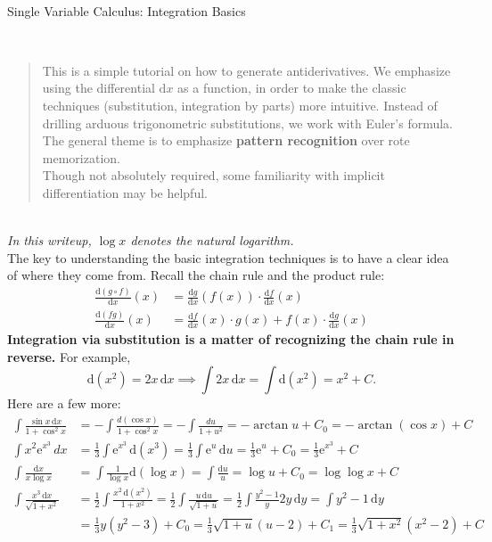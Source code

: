 \documentclass[12pt]{memoir}
\def\br{~\\[1em]}
\def\dd{\mathrm d}
\def\ee{\mathrm e}
\begin{document}
~\\[0em]
\begin{center}
\Large Single Variable Calculus: Integration Basics 
\end{center}
~\\[-2em]
\begin{abstract}
This is a simple tutorial on how to generate antiderivatives.
We emphasize using the differential $\dd x$ as a function,
in order to make the classic techniques (substitution,
integration by parts) more intuitive. Instead of drilling
arduous trigonometric substitutions, we work with Euler's formula.
The general theme is to emphasize \textbf{pattern recognition}
over rote memorization.
\br
Though not absolutely required,
some familiarity with implicit differentiation may be helpful.
\end{abstract}
~\\[0em]
\textit{In this writeup, $\log x$ denotes the natural logarithm.}
\br
The key to understanding the basic integration techniques is to
have a clear idea of where they come from. Recall the chain rule
and the product rule:
\begin{align*}
\frac{\dd(g\circ f)}{\dd x}(x)
&= \frac{\dd g}{\dd x}(f(x))\cdot\frac{\dd f}{\dd x}(x)\\[1em]
\frac{\dd(fg)}{\dd x}(x)
&= \frac{\dd f}{\dd x}(x)\cdot g(x)
+ f(x)\cdot\frac{\dd g}{\dd x}(x)
\end{align*}
\textbf{Integration via substitution is a matter of recognizing
the chain rule in reverse.} For example,
\[\dd(x^2) = 2x\,\dd x\implies\int 2x\,\dd x
= \int\dd(x^2) = x^2 + C.\]
Here are a few more:
\begin{align*}
\int\frac{\sin x\,\dd x}{1 + \cos^2 x}
&= -\int\frac{d(\cos x)}{1 + \cos^2 x}
= -\int\frac{du}{1 + u^2}
= -\arctan u + C_0
= \boxed{-\arctan(\cos x) + C}\\[1.5em]
\int x^2\ee^{x^3}\,dx &= \frac{1}{3}\int\ee^{x^3}\,\dd(x^3)
= \frac{1}{3}\int\ee^u\,\dd u
= \frac{1}{3}\ee^u + C_0
= \boxed{\frac{1}{3}\ee^{x^3} + C}\\[1.5em]
\int\frac{\dd x}{x\log x}
&= \int\frac{1}{\log x}\dd(\log x)
= \int\frac{\dd u}{u}
= \log u + C_0
= \boxed{\log\log x + C}\\[1.5em]
\int\frac{x^3\,\dd x}{\sqrt{1 + x^2}}
&= \frac{1}{2}\int\frac{x^2\,\dd(x^2)}{1 + x^2}
= \frac{1}{2}\int\frac{u\,\dd u}{\sqrt{1 + u}}
= \frac{1}{2}\int\frac{y^2 - 1}{y}2y\,\dd y
= \int y^2 - 1\,\dd y\\[0.5em]
&= \frac{1}{3}y(y^2 - 3) + C_0
= \frac{1}{3}\sqrt{1 + u}(u - 2) + C_1
= \boxed{\frac{1}{3}\sqrt{1 + x^2}(x^2 - 2) + C}
\end{align*}
\end{document}
